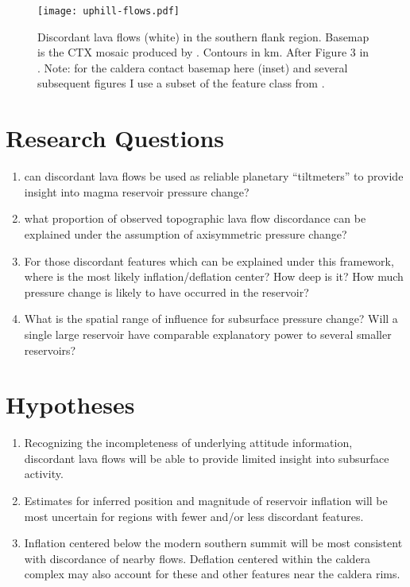 \begin{figure}
    \centering
    \texttt{[image: uphill-flows.pdf]}
    \caption[Discordant lava flows]{Discordant lava flows (white) in the southern flank region. Basemap is the \acf{CTX} mosaic produced by \textcite{Dickson2018AGB}. Contours in \unit{\km}. After Figure 3 in \textcite{mouginis-mark_late-stage_2019}. Note: for the caldera contact basemap here (inset) and several subsequent figures I use a subset of the feature class from \textcite{mouginis-mark_geologic_2021}.}%
    \label{fig:uphill-flows}
\end{figure}

\section{Research Questions}

\begin{enumerate}
    \item can discordant lava flows be used as reliable planetary ``tiltmeters'' to provide insight into magma reservoir pressure change?
    \item what proportion of observed topographic lava flow discordance can be explained under the assumption of axisymmetric pressure change?
    \item For those discordant features which can be explained under this framework, where is the most likely inflation/deflation center? How deep is it? How much pressure change is likely to have occurred in the reservoir?
    \item What is the spatial range of influence for subsurface pressure change? Will a single large reservoir have comparable explanatory power to several smaller reservoirs? 
\end{enumerate}

\section{Hypotheses}

\begin{enumerate}
    \item Recognizing the incompleteness of underlying attitude information, discordant lava flows will be able to provide limited insight into subsurface activity.
    \item Estimates for inferred position and magnitude of reservoir inflation will be most uncertain for regions with fewer and/or less discordant features. 
    \item Inflation centered below the modern southern summit will be most consistent with discordance of nearby flows. Deflation centered within the caldera complex may also account for these and other features near the caldera rims.
\end{enumerate}
